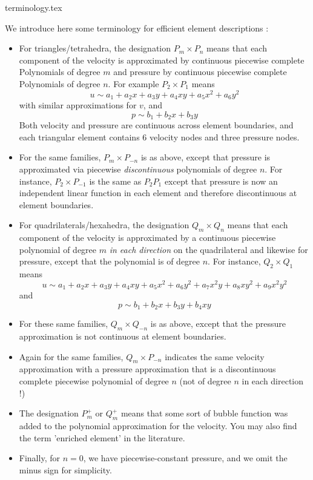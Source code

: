 \begin{flushright} {\tiny {\color{gray} terminology.tex}} \end{flushright}

We introduce here some terminology for efficient element descriptions \cite{grsa}:
\begin{itemize}
\item For triangles/tetrahedra, the designation 
$P_m \times P_n$ 
means that each component of the velocity
is approximated by continuous piecewise  complete Polynomials of degree $m$ and
pressure by continuous piecewise complete Polynomials of degree  $n$.
For example $P_2 \times P_1$ means 
\[
u \sim a_1 + a_2 x + a_3 y + a_4 xy + a_5 x^2 + a_6 y^2
\]
with similar approximations for $v$, and 
\[
p \sim b_1 + b_2x + b_3 y
\]
Both velocity and pressure are continuous across element boundaries, 
and each triangular element contains 6 velocity nodes and three pressure nodes.

\item For the same families,  
$P_m \times P_{-n}$
is as above, except that pressure is approximated via 
piecewise {\sl discontinuous} polynomials of degree $n$. For instance, $P_2 \times P_{-1}$ is the same 
as $P_2P_1$ except that pressure is now an independent linear function in each element and therefore 
discontinuous at element boundaries.

\item For quadrilaterals/hexahedra, the designation 
  $Q_m \times Q_n$
means that each component of the velocity
is approximated by a continuous piecewise polynomial of degree $m$ {\sl in each direction} on the quadrilateral
and likewise for pressure, except that the polynomial is of degree $n$.
For instance,  $Q_2 \times Q_1$  means
\[
u \sim a_1 + a_2 x + a_3 y + a_4 xy + a_5 x^2 + a_6 y^2 + a_7 x^2y + a_8 xy^2 + a_9 x^2y^2
\]
and 
\[
p \sim b_1 + b_2x + b_3 y + b_4 xy
\]
\item For these same families, $Q_m \times Q_{-n}$ is as above, except that the pressure approximation 
is not continuous at element boundaries. 

\item Again for the same families,  $Q_m \times P_{-n}$
 indicates the same velocity approximation 
with a pressure approximation that is a discontinuous complete piecewise polynomial of degree $n$
(not of degree $n$ in each direction !)

\item The designation $P_m^+$ or $Q_m^+$ means that some sort of bubble function 
was added to the polynomial approximation for the velocity. You may also find the term 'enriched element'
in the literature.

\item Finally, for $n=0$, we have piecewise-constant pressure, and we omit the minus sign for simplicity.
\end{itemize}

